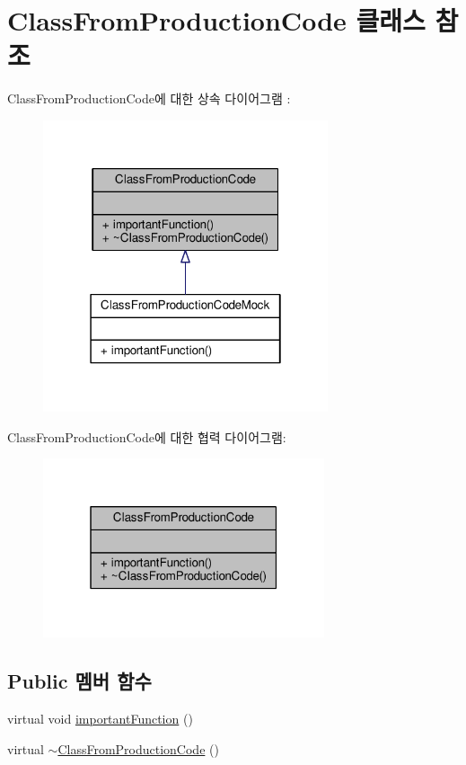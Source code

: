 \hypertarget{class_class_from_production_code}{}\section{Class\+From\+Production\+Code 클래스 참조}
\label{class_class_from_production_code}


Class\+From\+Production\+Code에 대한 상속 다이어그램 \+: 
\nopagebreak
\begin{figure}[H]
\begin{center}
\leavevmode
\includegraphics[width=238pt]{class_class_from_production_code__inherit__graph}
\end{center}
\end{figure}


Class\+From\+Production\+Code에 대한 협력 다이어그램\+:
\nopagebreak
\begin{figure}[H]
\begin{center}
\leavevmode
\includegraphics[width=235pt]{class_class_from_production_code__coll__graph}
\end{center}
\end{figure}
\subsection*{Public 멤버 함수}
\begin{DoxyCompactItemize}
\item 
virtual void \hyperlink{class_class_from_production_code_a1c36efc83e945cac88c18e52da55e612}{important\+Function} ()
\item 
virtual \hyperlink{class_class_from_production_code_a868462fdce6deb849a75e423ed49bc53}{$\sim$\+Class\+From\+Production\+Code} ()
\end{DoxyCompactItemize}


